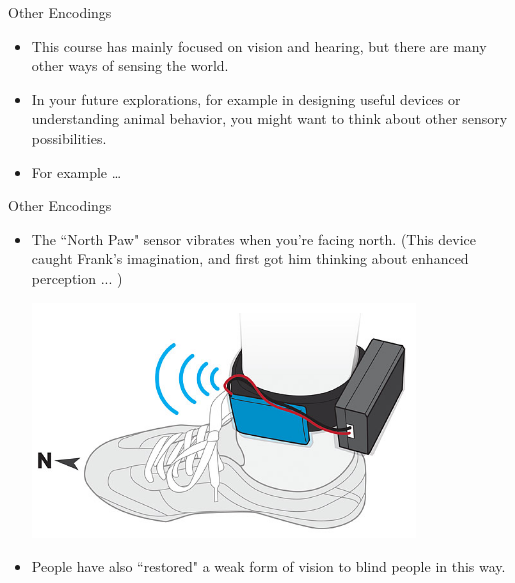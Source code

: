 \documentclass{beamer}
\begin{document}
\begin{frame}{Other Encodings}
   \begin{itemize}
      \item This course has mainly focused on vision and hearing, but there are many other ways of sensing the world.
      \item In your future explorations, for example in designing useful devices or understanding animal behavior, you might want to think about other sensory possibilities.
      \item For example \ldots
   \end{itemize}
\end{frame}

\begin{frame}{Other Encodings}
   \begin{itemize}
      \item The ``North Paw" sensor vibrates when you’re facing north. (This device caught Frank's imagination, and first got him thinking about enhanced perception ... )
      \begin{center}
         \includegraphics[width=0.8\textwidth]{figures/northpaw.jpg}
      \end{center}
      \item People have also ``restored" a weak form of vision to blind people in this way.
   \end{itemize}
\end{frame}
\end{document}

